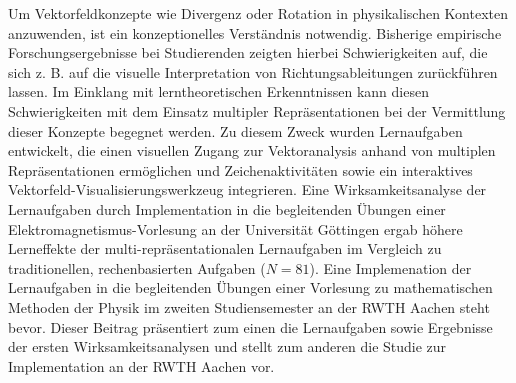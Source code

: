 \documentclass{scdpg}
\begin{document}
\begin{scAbstract}
{}
\scBeginText
%
Um Vektorfeldkonzepte wie Divergenz oder Rotation in physikalischen
Kontexten anzuwenden, ist ein konzeptionelles Verständnis
notwendig. Bisherige empirische Forschungsergebnisse bei Studierenden
zeigten hierbei Schwierigkeiten auf, die sich z. B. auf die visuelle
Interpretation von Richtungsableitungen zurückführen lassen.  Im
Einklang mit lerntheoretischen Erkenntnissen kann diesen
Schwierigkeiten mit dem Einsatz multipler Repräsentationen bei der
Vermittlung dieser Konzepte begegnet werden.  Zu diesem Zweck wurden
Lernaufgaben entwickelt, die einen visuellen Zugang zur Vektoranalysis
anhand von multiplen Repräsentationen ermöglichen und
Zeichenaktivitäten sowie ein interaktives
Vektorfeld-Visualisierungswerkzeug integrieren. Eine
Wirksamkeitsanalyse der Lernaufgaben durch Implementation in die
begleitenden Übungen einer Elektromagnetismus-Vorlesung an der
Universität Göttingen ergab höhere Lerneffekte der
multi-repräsentationalen Lernaufgaben im Vergleich zu traditionellen,
rechenbasierten Aufgaben ($N=81$). Eine Implemenation der Lernaufgaben
in die begleitenden Übungen einer Vorlesung zu mathematischen Methoden
der Physik im zweiten Studiensemester an der RWTH Aachen steht
bevor. Dieser Beitrag präsentiert zum einen die Lernaufgaben sowie
Ergebnisse der ersten Wirksamkeitsanalysen und stellt zum anderen die
Studie zur Implementation an der RWTH Aachen vor.
%
\scEndText
{}
\end{scAbstract}
\end{document}

